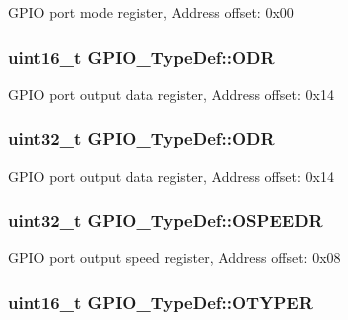 G\-P\-I\-O port mode register, Address offset\-: 0x00 \hypertarget{struct_g_p_i_o___type_def_a85ce31084cefb4431ee8fd397555a82f}{
\subsubsection[{O\-D\-R}]{ uint16\-\_\-t G\-P\-I\-O\-\_\-\-Type\-Def\-::\-O\-D\-R}}\label{struct_g_p_i_o___type_def_a85ce31084cefb4431ee8fd397555a82f}
G\-P\-I\-O port output data register, Address offset\-: 0x14 \hypertarget{struct_g_p_i_o___type_def_a6fb78f4a978a36032cdeac93ac3c9c8b}{
\subsubsection[{O\-D\-R}]{ uint32\-\_\-t G\-P\-I\-O\-\_\-\-Type\-Def\-::\-O\-D\-R}}\label{struct_g_p_i_o___type_def_a6fb78f4a978a36032cdeac93ac3c9c8b}
G\-P\-I\-O port output data register, Address offset\-: 0x14 \hypertarget{struct_g_p_i_o___type_def_a0d233d720f18ae2050f9131fa6faf7c6}{
\subsubsection[{O\-S\-P\-E\-E\-D\-R}]{ uint32\-\_\-t G\-P\-I\-O\-\_\-\-Type\-Def\-::\-O\-S\-P\-E\-E\-D\-R}}\label{struct_g_p_i_o___type_def_a0d233d720f18ae2050f9131fa6faf7c6}
G\-P\-I\-O port output speed register, Address offset\-: 0x08 \hypertarget{struct_g_p_i_o___type_def_a4c441e20e7dcea37e648e6e8f1eda862}{
\subsubsection[{O\-T\-Y\-P\-E\-R}]{ uint16\-\_\-t G\-P\-I\-O\-\_\-\-Type\-Def\-::\-O\-T\-Y\-P\-E\-R}}\label{struct_g_p_i_o___type_def_a4c441e20e7dcea37e648e6e8f1eda862}
